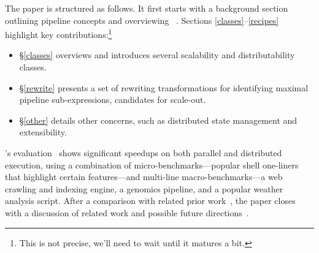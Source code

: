 \documentclass[sigplan,10pt,review,anonymous]{acmart}
\begin{document}

% 
% 
% 

The paper is structured as follows.
It first starts with a background section outlining pipeline concepts and overviewing \sys~.
Sections \ref{classes}--\ref{recipes} highlight key contributions:\footnote{
  This is not precise, we'll need to wait until it matures a bit.
}
\begin{itemize}

  \item
  \S\ref{classes} overviews \sys and introduces several scalability and distributability classes.

  \item
  \S\ref{rewrite} presents a set of rewriting transformations for identifying maximal pipeline sub-expressions, candidates for scale-out.

  \item
  \S\ref{other} details other concerns, such as distributed state management and extensibility.
\end{itemize}

\noindent
\sys's evaluation~ shows significant speedups on both parallel and distributed execution, using a combination of micro-bench\-marks---popular shell one-liners that highlight certain features---and multi-line macro-benchmarks---a web crawling and indexing engine, a genomics pipeline, and a popular weather analysis script.
After a comparison with related prior work~, the paper closes with a discussion of related work and possible future directions~.
\end{document}

